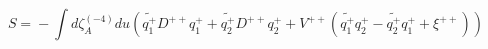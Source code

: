 \begin{equation}
\!\! S
\!=\!
-\!\!\displaystyle\int\! d\zeta_A^{(-4)}du \left({\widetilde{q_1^+}} D^{++}q_1^+
   +{\widetilde{q_2^+}}D^{++}q_2^+ +V^{++}({\widetilde{q_1^+}} q_2^+ 
   -{\widetilde{q_2^+}}q_1^+ +\xi^{++})\right) \label{eq:EHhss}
\end{equation}

